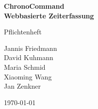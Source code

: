 \documentclass[hidelinks]{scrartcl}
\begin{document}
	\setlength{\parindent}{0pt}

	\begin{titlepage}

		\begin{center}
			\huge \bfseries ChronoCommand \\
			\large  Webbasierte Zeiterfassung
		\end{center}

		\begin{center}
				\large Pflichtenheft \\
		\end{center}

		\begin{center}
			Jannis Friedmann \\
			David Kuhmann \\
			Maria Schmid \\
			Xiaoming Wang \\
			Jan Zenkner \\

		\end{center}

		\begin{center}
			\large \today
		\end{center}
	
		\vfill
	\end{titlepage}
	\thispagestyle{empty}


	\clearpage
	\pagestyle{empty}
	\tableofcontents

	\clearpage
	\pagestyle{plain}
	\setcounter{page}{1}

	
	
	
	
	
	
	
	
	
	
	
	
\end{document}
